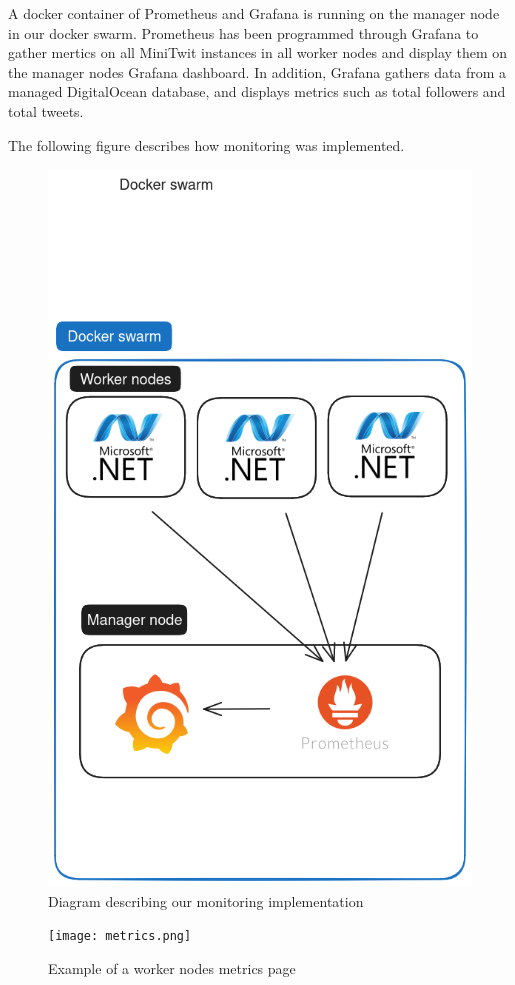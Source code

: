 A docker container of Prometheus and Grafana is running on the manager node in our docker swarm.
Prometheus has been programmed through Grafana to gather mertics on all MiniTwit instances in all worker nodes and display them on the manager nodes Grafana dashboard.
In addition, Grafana gathers data from a managed DigitalOcean database, and displays metrics such as total followers and total tweets.

The following figure describes how monitoring was implemented.

\begin{figure}[H]
	\centering
	\includegraphics[width=1\textwidth]{Monitoring2.png}
	\caption{Diagram describing our monitoring implementation}
	\label{fig:Monitoring2}
\end{figure}
\begin{figure}[H]
	\centering
	\texttt{[image: metrics.png]}
	\caption{Example of a worker nodes metrics page}
	\label{fig:metrics}
\end{figure}

